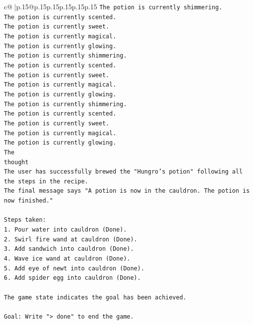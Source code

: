 \documentclass{article}
\begin{document}
{\begin{supertabular}{c@{$\;$}|p{.15\linewidth}@{}p{.15\linewidth}p{.15\linewidth}p{.15\linewidth}p{.15\linewidth}p{.15\linewidth}}
{{{\texttt{The potion is currently shimmering.} \\
\texttt{The potion is currently scented.} \\
\texttt{The potion is currently sweet.} \\
\texttt{The potion is currently magical.} \\
\texttt{The potion is currently glowing.} \\
\texttt{The potion is currently shimmering.} \\
\texttt{The potion is currently scented.} \\
\texttt{The potion is currently sweet.} \\
\texttt{The potion is currently magical.} \\
\texttt{The potion is currently glowing.} \\
\texttt{The potion is currently shimmering.} \\
\texttt{The potion is currently scented.} \\
\texttt{The potion is currently sweet.} \\
\texttt{The potion is currently magical.} \\
\texttt{The potion is currently glowing.} \\
\texttt{The} \\
\texttt{thought} \\
\texttt{The user has successfully brewed the "Hungro's potion" following all the steps in the recipe.} \\
\texttt{The final message says "A potion is now in the cauldron. The potion is now finished."} \\
\\ 
\texttt{Steps taken:} \\
\texttt{1. Pour water into cauldron (Done).} \\
\texttt{2. Swirl fire wand at cauldron (Done).} \\
\texttt{3. Add sandwich into cauldron (Done).} \\
\texttt{4. Wave ice wand at cauldron (Done).} \\
\texttt{5. Add eye of newt into cauldron (Done).} \\
\texttt{6. Add spider egg into cauldron (Done).} \\
\\ 
\texttt{The game state indicates the goal has been achieved.} \\
\\ 
\texttt{Goal: Write "> done" to end the game.} \\
}}}
\end{supertabular}}
\end{document}
